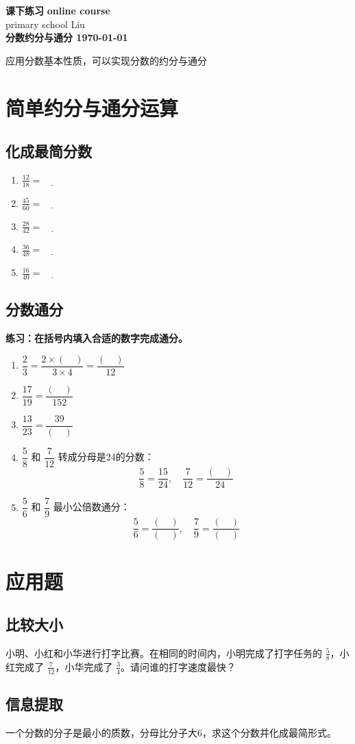 \documentclass[DIN, pagenumber=false, fontsize=11pt, parskip=half]{scrartcl}
\newcommand{\mytitle}[1]{{\noindent\Large\textbf{#1}}}
\begin{document}
\noindent\textbf{课下练习} \hfill \textbf{online course}\\
primary school \hfill Liu\\

\mytitle{分数约分与通分 \hfill \today}
\newline
\begin{parchmentquote}
	应用分数基本性质，可以实现分数的约分与通分
\end{parchmentquote}


\section{简单约分与通分运算}

\subsection{化成最简分数} 

\begin{enumerate}
    \item \(\frac{12}{18} = \underline{\qquad}\)
    \item \(\frac{45}{60} = \underline{\qquad}\)
    \item \(\frac{28}{42} = \underline{\qquad}\)
    \item \(\frac{36}{48} = \underline{\qquad}\)
    \item \(\frac{16}{40} = \underline{\qquad}\)
\end{enumerate}
\subsection{分数通分} 

\noindent \textbf{练习：在括号内填入合适的数字完成通分。}

\begin{enumerate}
    \item $\dfrac{2}{3} = \dfrac{2 \times (\quad)}{3 \times 4} = \dfrac{(\quad)}{12}$
    \item $\dfrac{17}{19}  = \dfrac{(\quad)}{152}$
    \item $\dfrac{13}{23}  = \dfrac{39}{(\quad)}$
    \item $\dfrac{5}{8}$ 和 $\dfrac{7}{12}$ 转成分母是24的分数：
    \[
    \frac{5}{8} = \frac{15}{24}, \quad \frac{7}{12} = \frac{(\quad)}{24}
    \]
     \item $\dfrac{5}{6}$ 和 $\dfrac{7}{9}$ 最小公倍数通分：
    \[
    \frac{5}{6} = \frac{(\quad)}{(\quad)}, \quad \frac{7}{9} = \frac{(\quad)}{(\quad)}
    \]
\end{enumerate}

\section{应用题}
\subsection{比较大小}
小明、小红和小华进行打字比赛。在相同的时间内，小明完成了打字任务的 $\frac{5}{8}$，小红完成了 $\frac{7}{12}$，小华完成了 $\frac{3}{4}$。请问谁的打字速度最快？
\subsection{信息提取}
一个分数的分子是最小的质数，分母比分子大6，求这个分数并化成最简形式。
\end{document}
